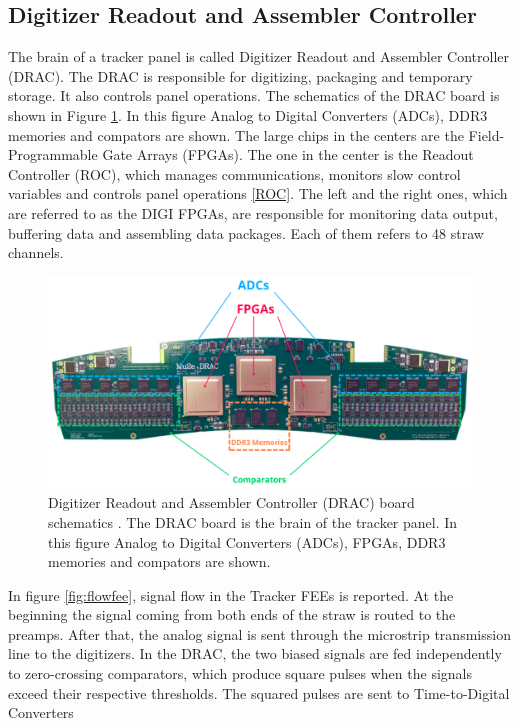 \subsection{Digitizer Readout and Assembler Controller}
The brain of a tracker panel is called Digitizer Readout and Assembler Controller (DRAC). 
The DRAC is responsible for digitizing, packaging and temporary storage. It also controls 
panel operations. The schematics of the DRAC board is shown in Figure \ref{fig:drac}. In 
this figure Analog to Digital Converters (ADCs), DDR3 memories and compators are shown. 
The large chips in the centers are the Field-Programmable Gate Arrays (FPGAs). The one 
in the center is the Readout Controller (ROC), which manages communications, monitors 
slow control variables and controls panel operations \ref{ROC}. The left and the right 
ones, which are referred to as the DIGI FPGAs, are responsible for monitoring data output, 
buffering data and assembling data packages. Each of them refers to 48 straw channels. 
\begin{figure}[!h]
\centering
\includegraphics[width =\textwidth]{figures/png/Screenshot_20240204_115052.png}
\caption{Digitizer Readout and Assembler Controller (DRAC) board schematics \cite{drac}. 
The DRAC board is the brain of the tracker panel. In this figure Analog to Digital Converters (ADCs), FPGAs, DDR3 memories and compators are shown.}
\label{fig:drac}
\end{figure}
In figure \ref{fig:flowfee}, signal flow in the Tracker FEEs is reported. At the 
beginning the signal coming from both ends of the straw is routed to the preamps. 
After that, the analog signal is sent through the microstrip transmission line to 
the digitizers. In the DRAC, the two biased signals are fed independently to 
zero-crossing comparators, which produce square pulses when the signals exceed 
their respective thresholds. The squared pulses are sent to Time-to-Digital Converters 
